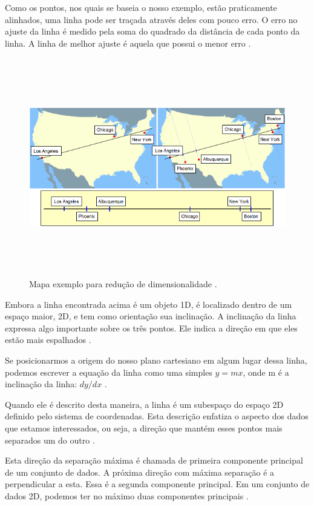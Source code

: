 Como os pontos, nos quais se baseia o nosso exemplo, estão praticamente alinhados, uma linha pode ser traçada através deles com pouco erro. O erro no ajuste da linha é medido pela soma do quadrado da distância de cada ponto da linha. A linha de melhor ajuste é aquela que possui o menor erro \cite{hewitt}.

	\begin{figure}[hbt]
		\begin{center}
			\includegraphics[height=9.5cm,width=12.5cm]{figuras/2.FundamentacaoTeorica/PCAexemploMapa.png}
		\end{center}
		\caption{Mapa exemplo para redução de dimensionalidade \cite{hewitt}.}
		\label{exemploPCA}
	\end{figure}

Embora a linha encontrada acima é um objeto 1D, é localizado dentro de um espaço maior, 2D, e tem como orientação sua inclinação. A inclinação da linha expressa algo importante sobre os três pontos. Ele indica a direção em que eles estão mais espalhados \cite{hewitt}.

Se posicionarmos a origem do nosso plano cartesiano em algum lugar dessa linha, podemos escrever a equação da linha como uma simples $y = mx$, onde m é a inclinação da linha: $dy / dx$ \cite{hewitt}.

Quando ele é descrito desta maneira, a linha é um subespaço do espaço 2D definido pelo sistema de coordenadas. Esta descrição enfatiza o aspecto dos dados que estamos interessados, ou seja, a direção que mantém esses pontos mais separados um do outro \cite{hewitt}.

Esta direção da separação máxima é chamada de primeira componente principal de um conjunto de dados. A próxima direção com máxima separação é a perpendicular a esta. Essa é a segunda componente principal. Em um conjunto de dados 2D, podemos ter no máximo duas componentes principais \cite{hewitt}.

